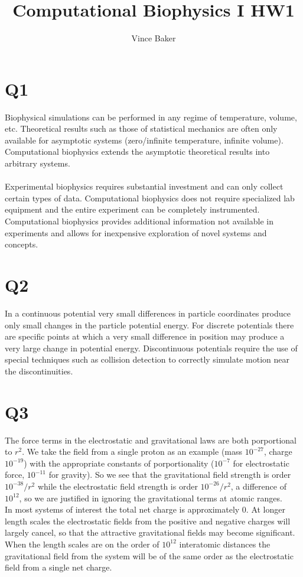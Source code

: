 \documentclass[a4paper,11pt]{article}
\title{Computational Biophysics I HW1}
\author{Vince Baker}
\numberwithin{equation}{section}
\begin{document}
\maketitle

\section{Q1}
Biophysical simulations can be performed in any regime of temperature, volume, etc.
Theoretical results such as those of statistical mechanics are often only available for asymptotic systems (zero/infinite temperature, infinite volume). 
Computational biophysics extends the asymptotic theoretical results into arbitrary systems.\\
\\
Experimental biophysics requires substantial investment and can only collect certain types of data. 
Computational biophysics does not require specialized lab equipment and the entire experiment can be completely instrumented. 
Computational biophysics provides additional information not available in experiments and allows for inexpensive exploration of novel systems and concepts.
\section{Q2}
In a continuous potential very small differences in particle coordinates produce only small changes in the particle potential energy. 
For discrete potentials there are specific points at which a very small difference in position may produce a very large change in potential energy. 
Discontinuous potentials require the use of special techniques such as collision detection to correctly simulate motion near the discontinuities.
\section{Q3}
The force terms in the electrostatic and gravitational laws are both porportional to $r^2$. 
We take the field from a single proton as an example (mass $10^{-27}$, charge $10^{-19}$) with the appropriate constants of porportionality ($10^{-7}$ for electrostatic force, $10^{-11}$ for gravity).
So we see that the gravitational field strength is order $10^{-38}/r^2$ while the electrostatic field strength is order $10^{-26}/r^2$, a difference of $10^12$, so we are justified in ignoring the gravitational terms at atomic ranges.
\\
In most systems of interest the total net charge is approximately 0.
At longer length scales the electrostatic fields from the positive and negative charges will largely cancel, so that the attractive gravitational fields may become significant.
When the length scales are on the order of $10^{12}$ interatomic distances the gravitational field from the system will be of the same order as the electrostatic field from a single net charge.
\end{document}
